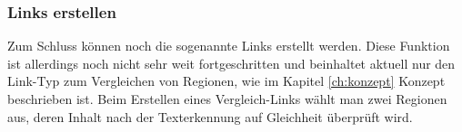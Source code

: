 \documentclass[nomenclature, oneside, 150]{HSMW-Thesis}
\begin{document}
			\subsubsection{Links erstellen}
			Zum Schluss können noch die sogenannte Links erstellt werden. Diese Funktion ist allerdings noch nicht sehr weit fortgeschritten und beinhaltet aktuell nur den Link-Typ zum Vergleichen von Regionen, wie im Kapitel \ref{ch:konzept} Konzept beschrieben ist. Beim Erstellen eines Vergleich-Links wählt man zwei Regionen aus, deren Inhalt nach der Texterkennung auf Gleichheit überprüft wird. 
			
			\begin{figure}[th]
    			\centering
				\begin{subfigure}[t]{0.3\textwidth}

\end{subfigure}
\end{figure}
\end{document}
